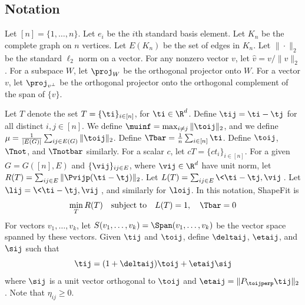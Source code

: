 \subsection{Notation} \label{sec-notation}
Let $[n] = \{1, \ldots, n\}$. Let $e_i$ be the $i$th standard basis element.  
Let $K_n$ be the complete graph on $n$ vertices.  Let $E(K_n)$ be the set of edges in $K_n$. 
Let  $\| \cdot \|_2$ be the standard $\ell_2$ norm on a vector. For any nonzero vector $v$, let $\hat{v} = v / \|v\|_2$.
For a subspace $W$, let $\proj_W$ be the orthogonal projector onto $W$. For a vector $v$, let $\proj_{v^\perp}$ be the orthogonal projector onto the orthogonal complement of the span of $\{v\}$.

Let $T$ denote the set $T = \{ \ti\}_{i \in [n]}$, for $\ti \in \R^{d}$.  Define $\tij = \ti - \tj$
for all distinct $i,j \in [n]$.    
We define $\muinf = \max_{i\neq j} \|\toij\|_2$, and we define $\mu=\frac{1}{|E(G)|}\sum_{ij\in E(G)}\|\toij\|_2$.
Define $\Tbar = \frac{1}{n} \sum_{i \in [n]} \ti$.  Define $\toij$, $\Tnot$, and $\Tnotbar$ similarly.  For a scalar $c$, let $c T = \{c t_i\}_{i\in [n]}$. 
 For a given $G=G([n],E)$ and $\{\vij\}_{ij \in E}$, where $\vij \in \R^{d}$ have unit norm, 
 let $R(T) = \sum_{ij \in E} \| \Pvijp (\ti - \tj) \|_2$.   Let $L(T) = \sum_{ij \in E} \< \ti - \tj, \vij \>$.  Let $\lij = \< \ti - \tj, \vij \>$, and similarly for $\loij$.  In this notation, ShapeFit is
\[
\min_T R(T) \quad \text{subject to} \quad  L(T) = 1, \quad \Tbar = 0
\]
For vectors $v_1, \ldots, v_k$, let $S(v_1, \ldots, v_k) = \Span(v_1, \ldots, v_k)$ be the vector space spanned by these vectors.  
Given $\tij$ and $\toij$, define $\deltaij$, $\etaij$, and $\sij$ such that 
\[
\tij = (1 + \deltaij) \toij + \etaij \sij
\]
where $\sij$ is a unit vector orthogonal to $\toij$ and $\etaij = \| P_{\toijperp} \tij \|_2$.
Note that $\eta_{ij} \ge 0$. 

